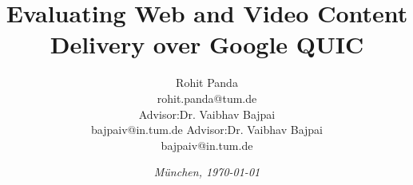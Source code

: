 %
% 
% 
%

\newcommand{\shiftedframetitle}[1]{\frametitle{\\\vspace{-2.5cm}#1}\vspace{0.5cm}}





\renewcommand{\PersonTitel}{}
\newcommand{\Datum}{\today}

\renewcommand{\PraesentationFusszeileZusatz}{| rohit.panda@tum.de | Master's Thesis}

\title{Evaluating Web and Video Content Delivery over Google QUIC}

\author{\vspace{2cm} Rohit Panda\\rohit.panda@tum.de \\ \vspace{0.2cm} Advisor:Dr. Vaibhav Bajpai \\ bajpaiv@in.tum.de
\vspace{0.2cm} Advisor:Dr. Vaibhav Bajpai \\ bajpaiv@in.tum.de}

\date[]{\textit{M\"unchen, \Datum} }




